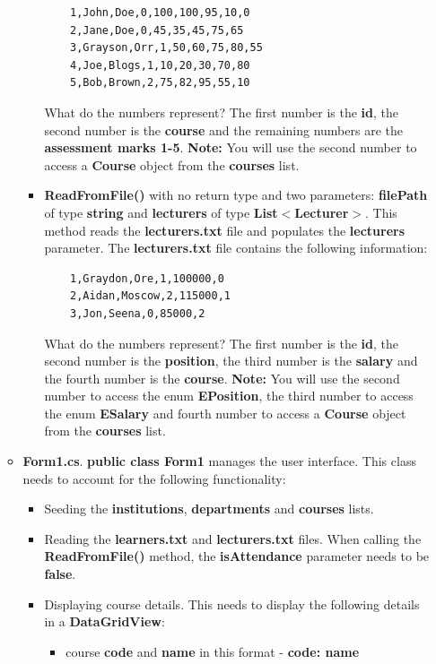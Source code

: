 \documentclass{article}
\begin{document}
\begin{itemize}
\begin{itemize}
\begin{itemize}
            \begin{verbatim}
	1,John,Doe,0,100,100,95,10,0
	2,Jane,Doe,0,45,35,45,75,65
	3,Grayson,Orr,1,50,60,75,80,55
	4,Joe,Blogs,1,10,20,30,70,80
	5,Bob,Brown,2,75,82,95,55,10
            \end{verbatim}
            What do the numbers represent? The first number is the \textbf{id}, the second number is the \textbf{course} and the remaining numbers are the \textbf{assessment marks 1-5}. \textbf{Note:} You will use the second number to access a \textbf{Course} object from the \textbf{courses} list.
            \item \textbf{ReadFromFile()} with no return type and two parameters: \textbf{filePath} of type \textbf{string} and \textbf{lecturers} of type \textbf{List$<$Lecturer$>$}. This method reads the \textbf{lecturers.txt} file and populates the \textbf{lecturers} parameter. The \textbf{lecturers.txt} file contains the following information:\\
            \begin{verbatim}
	1,Graydon,Ore,1,100000,0
	2,Aidan,Moscow,2,115000,1
	3,Jon,Seena,0,85000,2
            \end{verbatim}
            What do the numbers represent? The first number is the \textbf{id}, the second number is the \textbf{position}, the third number is the \textbf{salary} and the fourth number is the \textbf{course}. \textbf{Note:} You will use the second number to access the enum \textbf{EPosition}, the third number to access the enum \textbf{ESalary} and fourth number to access a \textbf{Course} object from the \textbf{courses} list.
        \end{itemize}
        \item \textbf{Form1.cs}. \textbf{public class Form1} manages the user interface. This class needs to account for the following functionality:
        \begin{itemize}
            \item Seeding the \textbf{institutions}, \textbf{departments} and \textbf{courses} lists.
            \item Reading the \textbf{learners.txt} and \textbf{lecturers.txt} files. When calling the \textbf{ReadFromFile()} method, the \textbf{isAttendance} parameter needs to be \textbf{false}.
            \item Displaying course details. This needs to display the following details in a \textbf{DataGridView}:
            \begin{itemize}
                \item course \textbf{code} and \textbf{name} in this format - \textbf{code: name}

\end{itemize}
\end{itemize}
\end{itemize}
\end{itemize}
\end{document}
